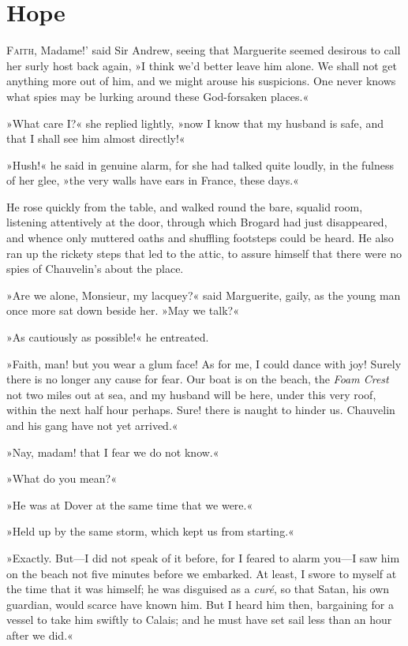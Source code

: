 
\chapter{Hope}
\lettrine[ante=`,lines=4]{F}{aith}, Madame!' said Sir Andrew, seeing that Marguerite seemed desirous to call her surly host back again, »I think we'd better leave him alone. We shall not get anything more out of him, and we might arouse his suspicions. One never knows what spies may be lurking around these God-forsaken places.«

»What care I?« she replied lightly, »now I know that my husband is safe, and that I shall see him almost directly!«

»Hush!« he said in genuine alarm, for she had talked quite loudly, in the fulness of her glee, »the very walls have ears in France, these days.«

He rose quickly from the table, and walked round the bare, squalid room, listening attentively at the door, through which Brogard had just disappeared, and whence only muttered oaths and shuffling footsteps could be heard. He also ran up the rickety steps that led to the attic, to assure himself that there were no spies of Chauvelin's about the place.

»Are we alone, Monsieur, my lacquey?« said Marguerite, gaily, as the young man once more sat down beside her. »May we talk?«

»As cautiously as possible!« he entreated.

»Faith, man! but you wear a glum face! As for me, I could dance with joy! Surely there is no longer any cause for fear. Our boat is on the beach, the \textit{Foam Crest} not two miles out at sea, and my husband will be here, under this very roof, within the next half hour perhaps. Sure! there is naught to hinder us. Chauvelin and his gang have not yet arrived.«

»Nay, madam! that I fear we do not know.«

»What do you mean?«

»He was at Dover at the same time that we were.«

»Held up by the same storm, which kept us from starting.«

»Exactly. But\allowbreak---\allowbreak I did not speak of it before, for I feared to alarm you\allowbreak---\allowbreak I saw him on the beach not five minutes before we embarked. At least, I swore to myself at the time that it was himself; he was disguised as a \textit{curé}, so that Satan, his own guardian, would scarce have known him. But I heard him then, bargaining for a vessel to take him swiftly to Calais; and he must have set sail less than an hour after we did.«

